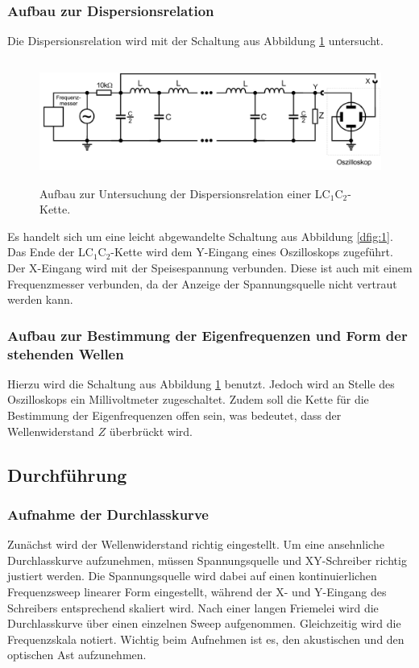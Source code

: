 \subsubsection{Aufbau zur Dispersionsrelation}
Die Dispersionsrelation wird mit der Schaltung aus Abbildung \ref{dfig:2} untersucht.

\begin{figure}[H]
  \centering
  \includegraphics[height=4cm]{dispersion.png}
  \caption{Aufbau zur Untersuchung der Dispersionsrelation einer LC$_1$C$_2$-Kette. \cite{sample}}
  \label{dfig:2}
\end{figure}

Es handelt sich um eine leicht abgewandelte Schaltung aus Abbildung \ref{dfig:1}.
Das Ende der LC$_1$C$_2$-Kette wird dem Y-Eingang eines Oszilloskops zugeführt.
Der X-Eingang wird mit der Speisespannung verbunden.
Diese ist auch mit einem Frequenzmesser verbunden, da der Anzeige der Spannungsquelle nicht vertraut werden kann.

\subsubsection{Aufbau zur Bestimmung der Eigenfrequenzen und Form der stehenden Wellen}
Hierzu wird die Schaltung aus Abbildung \ref{dfig:2} benutzt.
Jedoch wird an Stelle des Oszilloskops ein Millivoltmeter zugeschaltet.
Zudem soll die Kette für die Bestimmung der Eigenfrequenzen offen sein, was bedeutet, dass der Wellenwiderstand $Z$ überbrückt wird.

\subsection{Durchführung}
\subsubsection{Aufnahme der Durchlasskurve}
Zunächst wird der Wellenwiderstand richtig eingestellt.
Um eine ansehnliche Durchlasskurve aufzunehmen, müssen Spannungsquelle und XY-Schreiber richtig justiert werden.
Die Spannungsquelle wird dabei auf einen kontinuierlichen Frequenzsweep linearer Form eingestellt, während der X- und Y-Eingang des Schreibers entsprechend skaliert wird.
Nach einer langen Friemelei wird die Durchlasskurve über einen einzelnen Sweep aufgenommen.
Gleichzeitig wird die Frequenzskala notiert.
Wichtig beim Aufnehmen ist es, den akustischen und den optischen Ast aufzunehmen.


